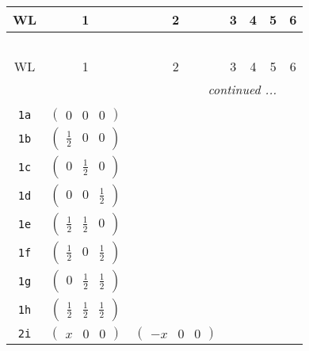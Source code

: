 \documentclass[fleqn,9pt,landscape]{jsarticle}
\begin{document}
\begin{center}
\renewcommand{\arraystretch}{1.2}
\begin{longtable}{ccccccc}
 \hline \hline
WL & 1 & 2 & 3 & 4 & 5 & 6 \\ \hline \endfirsthead

\multicolumn{6}{l}{\tablename\ \thetable{}} \\
 \hline \hline
WL & 1 & 2 & 3 & 4 & 5 & 6 \\ \hline \endhead

 \hline \hline
\multicolumn{6}{r}{\footnotesize\it continued ...} \\ \endfoot

 \hline \hline
\multicolumn{6}{r}{} \\ \endlastfoot

{\tt 1a} & $ \begin{pmatrix} 0 & 0 & 0 \end{pmatrix} $ & $  $ & $  $ & $  $ \\ \hline
{\tt 1b} & $ \begin{pmatrix} \frac{1}{2} & 0 & 0 \end{pmatrix} $ & $  $ & $  $ & $  $ \\ \hline
{\tt 1c} & $ \begin{pmatrix} 0 & \frac{1}{2} & 0 \end{pmatrix} $ & $  $ & $  $ & $  $ \\ \hline
{\tt 1d} & $ \begin{pmatrix} 0 & 0 & \frac{1}{2} \end{pmatrix} $ & $  $ & $  $ & $  $ \\ \hline
{\tt 1e} & $ \begin{pmatrix} \frac{1}{2} & \frac{1}{2} & 0 \end{pmatrix} $ & $  $ & $  $ & $  $ \\ \hline
{\tt 1f} & $ \begin{pmatrix} \frac{1}{2} & 0 & \frac{1}{2} \end{pmatrix} $ & $  $ & $  $ & $  $ \\ \hline
{\tt 1g} & $ \begin{pmatrix} 0 & \frac{1}{2} & \frac{1}{2} \end{pmatrix} $ & $  $ & $  $ & $  $ \\ \hline
{\tt 1h} & $ \begin{pmatrix} \frac{1}{2} & \frac{1}{2} & \frac{1}{2} \end{pmatrix} $ & $  $ & $  $ & $  $ \\ \hline
{\tt 2i} & $ \begin{pmatrix} x & 0 & 0 \end{pmatrix} $ & $ \begin{pmatrix} - x & 0 & 0 \end{pmatrix} $ & $  $ & $  $ \\ \hline

\end{longtable}
\end{center}
\end{document}
